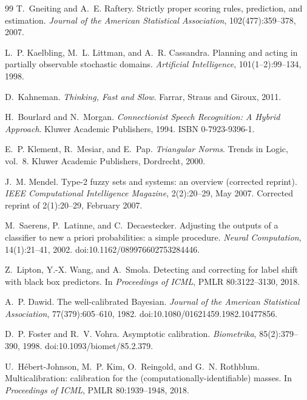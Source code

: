 \documentclass[11pt,a4paper]{article}
\numberwithin{equation}{section}
\theoremstyle{plain}
\theoremstyle{definition}
\theoremstyle{remark}
\begin{document}
\begin{thebibliography}{99}
T.~Gneiting and A.~E. Raftery.
\newblock Strictly proper scoring rules, prediction, and estimation.
\newblock \emph{Journal of the American Statistical Association}, 102(477):359--378, 2007.

L.~P. Kaelbling, M.~L. Littman, and A.~R. Cassandra.
\newblock Planning and acting in partially observable stochastic domains.
\newblock \emph{Artificial Intelligence}, 101(1--2):99--134, 1998.

D.~Kahneman.
\newblock \emph{Thinking, Fast and Slow}.
\newblock Farrar, Straus and Giroux, 2011.

H.~Bourlard and N.~Morgan.
\newblock \emph{Connectionist Speech Recognition: A Hybrid Approach}.
\newblock Kluwer Academic Publishers, 1994. ISBN 0-7923-9396-1.

E.~P. Klement, R.~Mesiar, and E.~Pap.
\newblock \emph{Triangular Norms}.
\newblock Trends in Logic, vol.~8. Kluwer Academic Publishers, Dordrecht, 2000.

J.~M. Mendel.
\newblock Type-2 fuzzy sets and systems: an overview (corrected reprint).
\newblock \emph{IEEE Computational Intelligence Magazine}, 2(2):20--29, May 2007. Corrected reprint of 2(1):20--29, February 2007.

M.~Saerens, P.~Latinne, and C.~Decaestecker.
\newblock Adjusting the outputs of a classifier to new a priori probabilities: a simple procedure.
\newblock \emph{Neural Computation}, 14(1):21--41, 2002. doi:10.1162/089976602753284446.

Z.~Lipton, Y.-X. Wang, and A.~Smola.
\newblock Detecting and correcting for label shift with black box predictors.
\newblock In \emph{Proceedings of ICML}, PMLR 80:3122--3130, 2018.

A.~P. Dawid.
\newblock The well-calibrated {B}ayesian.
\newblock \emph{Journal of the American Statistical Association}, 77(379):605--610, 1982. doi:10.1080/01621459.1982.10477856.

D.~P. Foster and R.~V. Vohra.
\newblock Asymptotic calibration.
\newblock \emph{Biometrika}, 85(2):379--390, 1998. doi:10.1093/biomet/85.2.379.

U.~H{\'e}bert-Johnson, M.~P. Kim, O.~Reingold, and G.~N. Rothblum.
\newblock Multicalibration: calibration for the (computationally-identifiable) masses.
\newblock In \emph{Proceedings of ICML}, PMLR 80:1939--1948, 2018.


\end{thebibliography}
\end{document}
